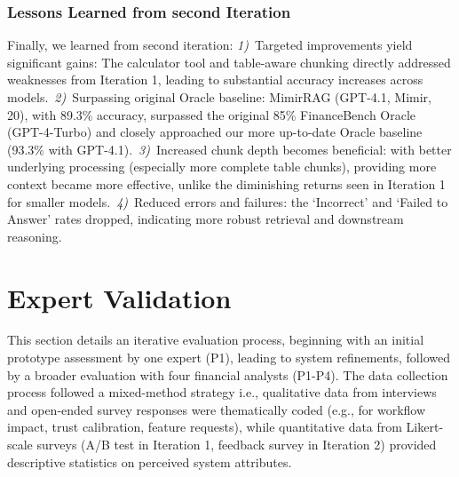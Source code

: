 \documentclass[final,5p,times,twopage,twocolumn,a4paper]{elsarticle}
\begin{document}
\subsubsection{Lessons Learned from second Iteration}
Finally, we learned from second iteration: \textit{1)}~Targeted improvements yield significant gains: The calculator tool and table-aware chunking directly addressed weaknesses from Iteration 1, leading to substantial accuracy increases across models.~\textit{2)}~Surpassing original Oracle baseline: MimirRAG (GPT-4.1, Mimir, 20), with 89.3\% accuracy, surpassed the original 85\% FinanceBench Oracle (GPT-4-Turbo) and closely approached our more up-to-date Oracle baseline (93.3\% with GPT-4.1).~\textit{3)}~Increased chunk depth becomes beneficial: with better underlying processing (especially more complete table chunks), providing more context became more effective, unlike the diminishing returns seen in Iteration 1 for smaller models.~\textit{4)}~Reduced errors and failures: the `Incorrect' and `Failed to Answer' rates dropped, indicating more robust retrieval and downstream reasoning.




\section{Expert Validation}
\label{sec:human-eval-overview}
This section details an iterative evaluation process, beginning with an initial prototype assessment by one expert (P1), leading to system refinements, followed by a broader evaluation with four financial analysts (P1-P4). The data collection process followed a mixed-method strategy i.e., qualitative data from interviews and open-ended survey responses were thematically coded (e.g., for workflow impact, trust calibration, feature requests), while quantitative data from Likert-scale surveys (A/B test in Iteration 1, feedback survey in Iteration 2) provided descriptive statistics on perceived system attributes.
\end{document}
